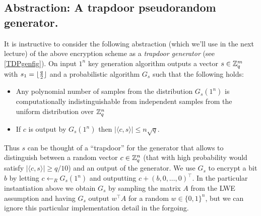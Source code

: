 \subsection{Abstraction: A trapdoor pseudorandom
generator.}\label{Abstraction-A-trapdoor-ps}

It is instructive to consider the following abstraction (which we'll use
in the next lecture) of the above encryption scheme as a \emph{trapdoor
generator} (see \cref{TDPgenfig}). On input \(1^n\) key generation
algorithm outputs a vector \(s\in{\mathbb{Z}}_q^m\) with
\(s_1 = \lfloor \tfrac{q}{2} \rfloor\) and a probabilistic algorithm \(G_s\)
such that the following holds:

\begin{itemize}
\item
  Any polynomial number of samples from the distribution \(G_s(1^n)\) is
  computationally indistinguishable from independent samples from the
  uniform distribution over \({\mathbb{Z}}_q^n\)
\item
  If \(c\) is output by \(G_s(1^n)\) then
  \(|\langle c,s \rangle| \leq n\sqrt{q}\).
\end{itemize}

Thus \(s\) can be thought of a ``trapdoor'' for the generator that
allows to distinguish between a random vector \(c\in {\mathbb{Z}}_q^n\) (that with
high probability would satisfy \(|\langle c,s \rangle|\geq q/10\)) and
an output of the generator. We use \(G_s\) to encrypt a bit \(b\) by
letting \(c \leftarrow_R G_s(1^n)\) and outputting
\(c + (b,0,\ldots,0)^\top\). In the particular instantiation above we
obtain \(G_s\) by sampling the matrix \(A\) from the LWE assumption and
having \(G_s\) output \(w^\top A\) for a random \(w\in\{0,1\}^n\), but
we can ignore this particular implementation detail in the forgoing.


